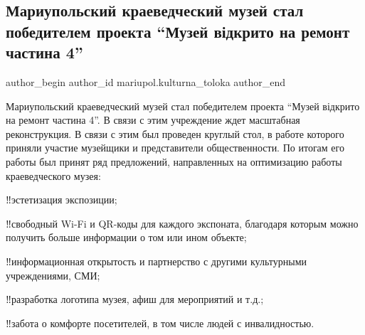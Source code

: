  
 
 
 
 

\subsection{Мариупольский краеведческий музей  стал победителем проекта \enquote{Музей відкрито на ремонт частина 4}}
\label{sec:02_02_2019.fb.mariupol.kulturna_toloka.1.mkm_proekt_muzej_remont_chastyna_4}

\ifcmt
 author_begin
   author_id mariupol.kulturna_toloka
 author_end
\fi

Мариупольский краеведческий музей  стал победителем проекта \enquote{Музей відкрито на
ремонт частина 4}. В связи с этим учреждение ждет масштабная реконструкция. В
связи с этим был проведен круглый стол, в работе которого приняли участие
музейщики и представители общественности. По итогам его работы был принят ряд
предложений, направленных на оптимизацию работы краеведческого музея:

‼️эстетизация экспозиции;\par
‼️свободный Wi-Fi и QR-коды для каждого экспоната, благодаря которым можно получить больше информации о том или ином объекте;\par
‼️информационная открытость и партнерство с другими культурными учреждениями, СМИ;\par
‼️разработка логотипа музея, афиш для мероприятий и т.д.;\par
‼️забота о комфорте посетителей, в том числе людей с инвалидностью.\par
